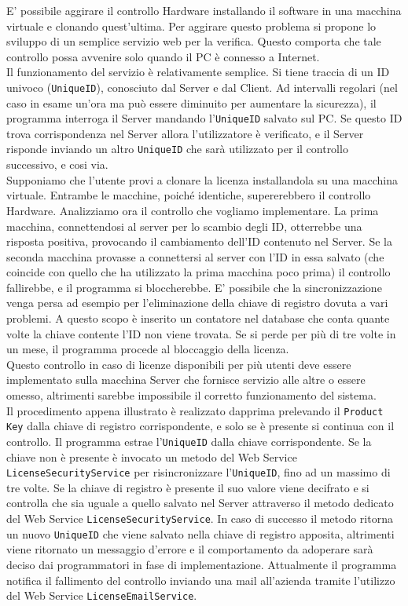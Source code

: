 E' possibile aggirare il controllo Hardware installando il software in una macchina virtuale e clonando quest'ultima. Per aggirare questo problema si propone lo sviluppo di un semplice servizio web per la verifica. Questo comporta che tale controllo possa avvenire solo quando il PC è connesso a Internet.\\
Il funzionamento del servizio è relativamente semplice. Si tiene traccia di un ID univoco (\texttt{UniqueID}), conosciuto dal Server e dal Client. Ad intervalli regolari (nel caso in esame un’ora ma può essere diminuito per aumentare la sicurezza), il programma interroga il Server mandando l'\texttt{UniqueID} salvato sul PC. Se questo ID trova corrispondenza nel Server allora l'utilizzatore è verificato, e il Server risponde inviando un altro \texttt{UniqueID} che sarà utilizzato per il controllo successivo, e cosi via.
\\Supponiamo che l'utente provi a clonare la licenza installandola su una macchina virtuale. Entrambe le macchine, poiché identiche, supererebbero il controllo Hardware. Analizziamo ora il controllo che vogliamo implementare. La prima macchina, connettendosi al server per lo scambio degli ID, otterrebbe una risposta positiva, provocando il cambiamento dell'ID contenuto nel Server. Se la seconda macchina provasse a connettersi al server con l'ID in essa salvato (che coincide con quello che ha utilizzato la prima macchina poco prima) il controllo fallirebbe, e il programma si bloccherebbe. E' possibile che la sincronizzazione venga persa ad esempio per l'eliminazione della chiave di registro dovuta a vari problemi. A questo scopo è inserito un contatore nel database che conta quante volte la chiave contente l'ID non viene trovata. Se si perde per più di tre volte in un mese, il programma procede al bloccaggio della licenza.\\
Questo controllo in caso di licenze disponibili per più utenti deve essere implementato sulla macchina Server che fornisce servizio alle altre o essere omesso, altrimenti sarebbe impossibile il corretto funzionamento del sistema.\\
Il procedimento appena illustrato è realizzato dapprima prelevando il \texttt{Product Key} dalla chiave di registro corrispondente, e solo se è presente si continua con il controllo. Il programma estrae l'\texttt{UniqueID} dalla chiave corrispondente. Se la chiave non è presente è invocato un metodo del Web Service \texttt{LicenseSecurityService} per risincronizzare l’\texttt{UniqueID}, fino ad un massimo di tre volte. Se la chiave di registro è presente il suo valore viene decifrato e si controlla che sia uguale a quello salvato nel Server attraverso il metodo dedicato del Web Service \texttt{LicenseSecurityService}. In caso di successo il metodo ritorna un nuovo \texttt{UniqueID} che viene salvato nella chiave di registro apposita, altrimenti viene ritornato un messaggio d’errore e il comportamento da adoperare sarà deciso dai programmatori in fase di implementazione. Attualmente il programma notifica il fallimento del controllo inviando una mail all'azienda tramite l'utilizzo del Web Service \texttt{LicenseEmailService}. 


